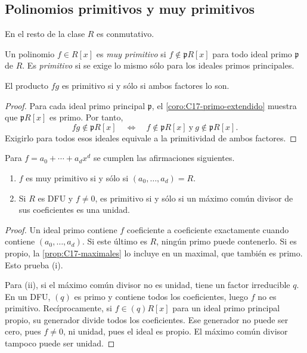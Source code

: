 \subsection{Polinomios primitivos y muy primitivos}
En el resto de la clase $R$ es conmutativo.
\begin{defi}
Un polinomio $f\in R[x]$ es \emph{muy primitivo} si $f\notin\mathfrak pR[x]$ para todo ideal primo $\mathfrak p$ de $R$. Es \emph{primitivo} si se exige lo mismo sólo para los ideales primos principales.
\end{defi}
\begin{lema}\label{lema:C17-producto-primitivo}
El producto $fg$ es primitivo si y sólo si ambos factores lo son.
\end{lema}
\begin{proof}
Para cada ideal primo principal $\mathfrak p$, el \cref{coro:C17-primo-extendido} muestra que $\mathfrak pR[x]$ es primo. Por tanto,
\[
fg\notin\mathfrak pR[x]
\quad\Longleftrightarrow\quad
f\notin\mathfrak pR[x]\ \text{y}\ g\notin\mathfrak pR[x].
\]
Exigirlo para todos esos ideales equivale a la primitividad de ambos factores.
\end{proof}
\begin{lema}\label{lema:C17-criterios-primitivo}
Para $f=a_0+\cdots+a_dx^d$ se cumplen las afirmaciones siguientes.
\begin{enumerate}[label=\textup{(\roman*)}]
\item $f$ es muy primitivo si y sólo si $(a_0,\ldots,a_d)=R$.
\item Si $R$ es DFU y $f\ne0$, es primitivo si y sólo si un máximo común divisor de sus coeficientes es una unidad.
\end{enumerate}
\end{lema}
\begin{proof}
Un ideal primo contiene $f$ coeficiente a coeficiente exactamente cuando contiene $(a_0,\ldots,a_d)$. Si este último es $R$, ningún primo puede contenerlo. Si es propio, la \cref{prop:C17-maximales} lo incluye en un maximal, que también es primo. Esto prueba (i).

Para (ii), si el máximo común divisor no es unidad, tiene un factor irreducible $q$. En un DFU, $(q)$ es primo y contiene todos los coeficientes, luego $f$ no es primitivo. Recíprocamente, si $f\in(q)R[x]$ para un ideal primo principal propio, su generador divide todos los coeficientes. Ese generador no puede ser cero, pues $f\ne0$, ni unidad, pues el ideal es propio. El máximo común divisor tampoco puede ser unidad.
\end{proof}


